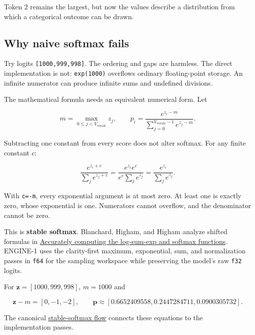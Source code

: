 Token 2 remains the largest, but now the values describe a distribution
from which a categorical outcome can be drawn.

\subsection{Why naive softmax fails}\label{why-naive-softmax-fails}

Try logits \texttt{{[}1000,999,998{]}}. The ordering and gaps are
harmless. The direct implementation is not: \texttt{exp(1000)} overflows
ordinary floating-point storage. An infinite numerator can produce
infinite sums and undefined divisions.

The mathematical formula needs an equivalent numerical form. Let

\begin{equation}
m=\max_{0\le j<V_{\mathrm{vocab}}}z_j,
\qquad
p_i=\frac{e^{z_i-m}}
{\sum_{j=0}^{V_{\mathrm{vocab}}-1}e^{z_j-m}}.
\end{equation}

Subtracting one constant from every score does not alter softmax. For
any finite constant \(c\):

\begin{equation}
\frac{e^{z_i+c}}{\sum_j e^{z_j+c}}
=\frac{e^{z_i}e^c}{e^c\sum_j e^{z_j}}
=\frac{e^{z_i}}{\sum_j e^{z_j}}.
\end{equation}

With \texttt{c=-m}, every exponential argument is at most zero. At least
one is exactly zero, whose exponential is one. Numerators cannot
overflow, and the denominator cannot be zero.

This is \textbf{stable softmax}. Blanchard, Higham, and Higham analyze
shifted formulas in
\href{https://doi.org/10.1093/imanum/draa038}{Accurately computing the
log-sum-exp and softmax functions}. ENGINE-1 uses the clarity-first
maximum, exponential, sum, and normalization passes in \texttt{f64} for
the sampling workspace while preserving the model's raw \texttt{f32}
logits.

For \(\mathbf{z}=[1000,999,998]\), \(m=1000\) and

\begin{equation}
\mathbf{z}-m=[0,-1,-2],\qquad
\mathbf{p}\approx[0.6652409558,0.2447284711,0.0900305732].
\end{equation}

The canonical
\href{https://github.com/hermonai/inside-the-llm-engine/blob/astra-visual-rewrite/diagrams/sampling/stable-softmax.txt}{stable-softmax
flow} connects these equations to the implementation passes.

